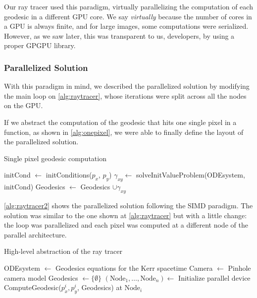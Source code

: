 Our ray tracer used this paradigm, virtually parallelizing the computation of each geodesic in a different \ac{GPU} core. We say \emph{virtually} because the number of cores in a \ac{GPU} is always finite, and for large images, some computations were serialized. However, as we saw later, this was transparent to us, developers, by using a proper \ac{GPGPU} library.

\subsubsection*{Parallelized Solution}

With this paradigm in mind, we described the parallelized solution by modifying the main loop on \autoref{alg:raytracer}, whose iterations were split across all the nodes on the \ac{GPU}.

If we abstract the computation of the geodesic that hits one single pixel in a function, as shown in \autoref{alg:onepixel}, we were able to finally define the layout of the parallelized solution.

\begin{algorithm}[bth]
	\caption{Single pixel geodesic computation}
	\label{alg:onepixel}
	\begin{algorithmic}[1]
		\State initCond $\gets$ initConditions($p_x$, $p_y$)
		\State $\gamma_{xy} \gets$ solveInitValueProblem(ODEsystem, initCond)
		\State Geodesics $\gets$ Geodesics $\cup \gamma_{xy}$
		\EndFunction
	\end{algorithmic}
\end{algorithm}

\autoref{alg:raytracer2} shows the parallelized solution following the \ac{SIMD} paradigm. The solution was similar to the one shown at \autoref{alg:raytracer} but with a little change: the loop was parallelized and each pixel was computed at a different node of the parallel architecture.

\begin{algorithm}
	\caption{High-level abstraction of the ray tracer}
	\label{alg:raytracer2}
	\begin{algorithmic}[1]
		\State ODEsystem $\gets$ Geodesics equations for the Kerr spacetime
		\State Camera $\gets$ Pinhole camera model
		\State Geodesics $\gets \{\emptyset\}$
		\State $(\textrm{Node}_1, \dots, \textrm{Node}_n) \gets$ Initialize parallel device
		\State ComputeGeodesic($p^i_x, p^i_y$, Geodesics) at $\textrm{Node}_i$
		\EndFor
		\EndFunction
	\end{algorithmic}
\end{algorithm}

